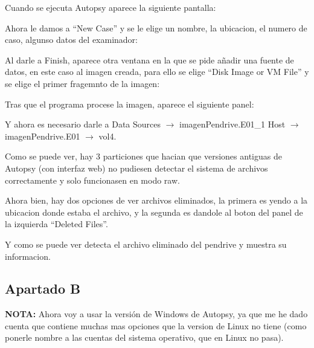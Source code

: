 \documentclass{article}
\begin{document}
Cuando se ejecuta Autopsy aparece la siguiente pantalla:


Ahora le damos a ``New Case'' y se le elige un nombre, la ubicacion, el numero de caso, algunso datos del examinador:


Al darle a Finish, aparece otra ventana en la que se pide añadir una fuente de datos, en este caso al imagen creada, para ello se elige ``Disk Image or VM File'' y se elige el primer fragemnto de la imagen:


Tras que el programa procese la imagen, aparece el siguiente panel:


Y ahora es necesario darle a Data Sources $\rightarrow$ imagenPendrive.E01\_1 Host $\rightarrow$ imagenPendrive.E01 $\rightarrow$ vol4.


Como se puede ver, hay 3 particiones que hacian que versiones antiguas de Autopsy (con interfaz web) no pudiesen detectar el sistema de archivos correctamente y solo funcionasen en modo raw.

Ahora bien, hay dos opciones de ver archivos eliminados, la primera es yendo a la ubicacion donde estaba el archivo, y la segunda es dandole al boton del panel de la izquierda ``Deleted Files''.


Y como se puede ver detecta el archivo eliminado del pendrive y muestra su informacion.


\subsection*{Apartado B}

\textbf{NOTA: }Ahora voy a usar la versión de Windows de Autopsy, ya que me he dado cuenta que contiene muchas mas opciones que la version de Linux no tiene (como ponerle nombre a las cuentas del sistema operativo, que en Linux no pasa).
\end{document}

